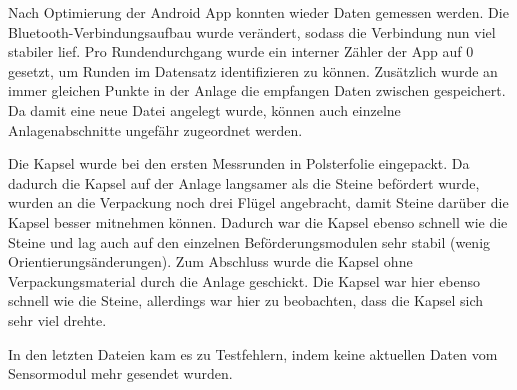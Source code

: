 Nach Optimierung der Android App konnten wieder Daten gemessen werden. Die Bluetooth-Verbindungsaufbau wurde verändert, sodass die Verbindung nun viel stabiler lief. Pro Rundendurchgang wurde ein interner Zähler der App auf 0 gesetzt, um Runden im Datensatz identifizieren zu können. Zusätzlich wurde an immer gleichen Punkte in der Anlage die empfangen Daten zwischen gespeichert. Da damit eine neue Datei angelegt wurde, können auch einzelne Anlagenabschnitte ungefähr zugeordnet werden.

Die Kapsel wurde bei den ersten Messrunden in Polsterfolie eingepackt. Da dadurch die Kapsel auf der Anlage langsamer als die Steine befördert wurde, wurden an die Verpackung noch drei Flügel angebracht, damit Steine darüber die Kapsel besser mitnehmen können. Dadurch war die Kapsel ebenso schnell wie die Steine und lag auch auf den einzelnen Beförderungsmodulen sehr stabil (wenig Orientierungsänderungen). Zum Abschluss wurde die Kapsel ohne Verpackungsmaterial durch die Anlage geschickt. Die Kapsel war hier ebenso schnell wie die Steine, allerdings war hier zu beobachten, dass die Kapsel sich sehr viel drehte. 

In den letzten Dateien kam es zu Testfehlern, indem keine aktuellen Daten vom Sensormodul mehr gesendet wurden.